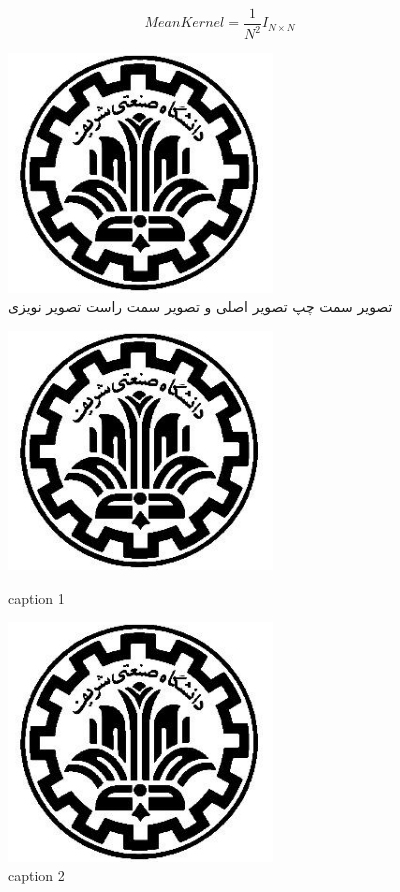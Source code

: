 \documentclass[12pt,a4paper,colorlinks=true]{article}
\begin{document}
	
	$$ MeanKernel = \frac{1}{N^2}I_{N\times N} $$
	
	\begin{figure}[!hbt]
		\centering
		\includegraphics[width = 7cm]{SharifLogo.png} 
		\caption{تصویر سمت چپ تصویر اصلی و تصویر سمت راست تصویر نویزی}
		\label{q211}
	\end{figure}

\newpage

	\begin{figure}[!hbt]
		\centering
		\begin{minipage}{.5\linewidth}
			\includegraphics[width = 7cm]{SharifLogo.png}
			\caption{caption 1}
			\label{q3115}
		\end{minipage}%
		\begin{minipage}{.5\linewidth}
			\includegraphics[width = 7cm]{SharifLogo.png}
			\caption{caption 2}
			\label{q3116}
		\end{minipage}
	\end{figure}
\end{document}
